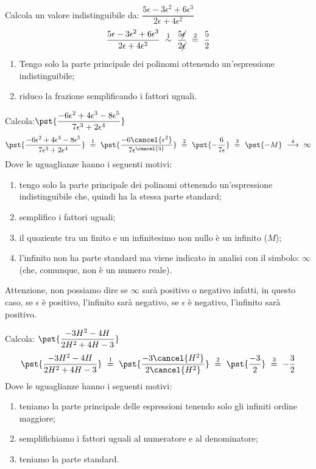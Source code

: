 \begin{esempio}
Calcola un valore indistinguibile da:
\(\dfrac{5\epsilon -3 \epsilon^2 + 6 \epsilon^3}
         {2\epsilon + 4 \epsilon^2}\)
\[\dfrac{5\epsilon -3 \epsilon^2 + 6 \epsilon^3}
         {2\epsilon + 4 \epsilon^2} 
~ \stackrel{1}{\sim} ~
  \dfrac{5 \cancel{\epsilon}}{2 \cancel{\epsilon}} 
~ \stackrel{2}{=} ~
  \dfrac{5}{2}\]
\begin{enumerate} [nosep]
 \item Tengo solo la parte principale dei polinomi ottenendo un'espressione 
indistinguibile;
 \item riduco la frazione semplificando i fattori uguali.
\end{enumerate}
\end{esempio}

\begin{esempio}
Calcola:\quad \(\pst{\dfrac{-6\epsilon^2 +4 \epsilon^3 -8 \epsilon^5}
             {7\epsilon^3 + 2 \epsilon^4}}\)
\[\pst{\dfrac{-6\epsilon^2 +4 \epsilon^3 -8 \epsilon^5}
             {7\epsilon^3 + 2 \epsilon^4}} 
~ \stackrel{1}{=} ~
  \pst{\dfrac{-6\cancel{\epsilon^2}}
             {7\epsilon^{\cancel{3}}}} 
~ \stackrel{2}{=} ~
  \pst{-\dfrac{6}{7\epsilon}}  
~ \stackrel{3}{=} ~
  \pst{-M} 
~ \stackrel{4}{\longrightarrow} ~
  \infty\]
Dove le uguaglianze hanno i seguenti motivi:
\begin{enumerate} [nosep]
 \item tengo solo la parte principale dei polinomi ottenendo un'espressione 
indistinguibile che, quindi ha la stessa parte standard;
 \item semplifico i fattori uguali;
 \item il quoziente tra un finito e un infinitesimo non nullo è un 
infinito (\(M\));
 \item l'infinito non ha parte standard ma viene indicato in analisi con 
il simbolo: \(\infty\) (che, comunque, non è un numero reale).
\end{enumerate}
\begin{osservazione}
 Attenzione, non possiamo dire se \(\infty\) sarà positivo o negativo 
infatti, in questo caso, se \(\epsilon\) è positivo, l'infinito sarà 
negativo,  se \(\epsilon\) è negativo, l'infinito sarà positivo.
\end{osservazione}
\end{esempio}

\begin{esempio}
Calcola: \quad \(\pst{\dfrac{-3H^2 -4H}{2H^2 +4H -3}}\)
\[\pst{\dfrac{-3H^2 -4H}{2H^2 +4H -3}} 
~ \stackrel{1}{=} ~
  \pst{\dfrac{-3\cancel{H^2}}{2\cancel{H^2}}} 
~ \stackrel{2}{=} ~
  \pst{\dfrac{-3}{2}} 
~ \stackrel{3}{=} ~
  -\dfrac{3}{2}\]
Dove le uguaglianze hanno i seguenti motivi:
\begin{enumerate} [nosep]
 \item teniamo la parte principale delle espressioni tenendo solo gli 
infiniti ordine maggiore; 
 \item semplifichiamo i fattori uguali al numeratore e al denominatore; 
 \item teniamo la parte standard.
\end{enumerate}
\end{esempio}

